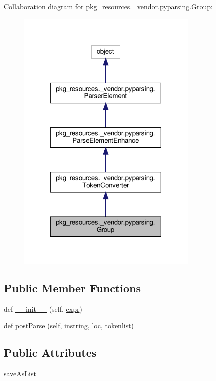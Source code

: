 Collaboration diagram for pkg\+\_\+resources.\+\_\+vendor.\+pyparsing.\+Group\+:
\nopagebreak
\begin{figure}[H]
\begin{center}
\leavevmode
\includegraphics[width=246pt]{classpkg__resources_1_1__vendor_1_1pyparsing_1_1Group__coll__graph}
\end{center}
\end{figure}
\subsection*{Public Member Functions}
\begin{DoxyCompactItemize}
\item 
def \hyperlink{classpkg__resources_1_1__vendor_1_1pyparsing_1_1Group_a4027ca22a29af1111ae2c7c0194bb330}{\+\_\+\+\_\+init\+\_\+\+\_\+} (self, \hyperlink{classpkg__resources_1_1__vendor_1_1pyparsing_1_1ParseElementEnhance_a34e02b3404b2a545ca1be8b522758896}{expr})
\item 
def \hyperlink{classpkg__resources_1_1__vendor_1_1pyparsing_1_1Group_a2fdaf84a40e16b32658acd842a7c8582}{post\+Parse} (self, instring, loc, tokenlist)
\end{DoxyCompactItemize}
\subsection*{Public Attributes}
\begin{DoxyCompactItemize}
\item 
\hyperlink{classpkg__resources_1_1__vendor_1_1pyparsing_1_1Group_a24b2b05e0aecefa6623eb3ffe38ec492}{save\+As\+List}
\end{DoxyCompactItemize}
